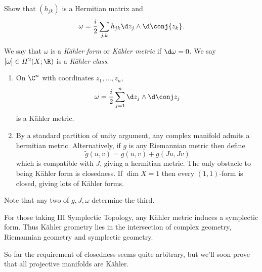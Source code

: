\documentclass[a4paper]{article}
\newcommand{\w}{\wedge} %
\begin{document}
\begin{ex}
  Show that \((h_{jk})\) is a Hermitian matrix and
  \[
    \omega = \frac{i}{2} \sum_{j, k} h_{jk} \d z_j \w \d \conj{z_k}.
  \]
\end{ex}

\begin{definition}
  We say that \(\omega\) is a \emph{Kähler form} or \emph{Kähler metric} if \(\d \omega = 0\). We say \([\omega] \in H^2(X; \R)\) is a \emph{Kähler class}.
\end{definition}

\begin{eg}\leavevmode
  \begin{enumerate}
  \item On \(\C^n\) with coordinates \(z_1, \dots, z_n\),
    \[
      \omega = \frac{i}{2} \sum_{j = 1}^n \d z_j \w \d \conj z_j
    \]
    is a Kähler metric.
  \item By a standard partition of unity argument, any complex manifold admits a hermitian metric. Alternatively, if \(g\) is any Riemannian metric then define
    \[
      \tilde g(u, v) = g(u, v) + g(Ju, Jv)
    \]
    which is compatible with \(J\), giving a hermitian metric. The only obstacle to being Kähler form is closedness. If \(\dim X = 1\) then every \((1, 1)\)-form is closed, giving lots of Kähler forms.
  \end{enumerate}
\end{eg}

Note that any two of \(g, J, \omega\) determine the third.

\begin{remark}
  For those taking III Symplectic Topology, any Kähler metric induces a symplectic form. Thus Kähler geometry lies in the intersection of complex geometry, Riemannian geometry and symplectic geometry.
\end{remark}

So far the requirement of closedness seems quite arbitrary, but we'll soon prove that all projective manifolds are Kähler.
\end{document}

